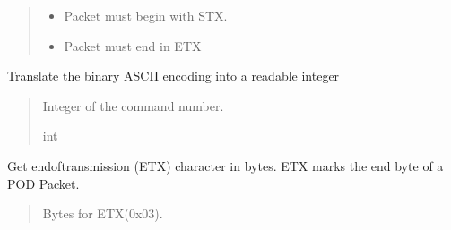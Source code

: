 \documentclass[letterpaper,10pt,english]{sphinxmanual}
\begin{document}
\begin{fulllineitems}
\begin{fulllineitems}
\begin{quote}
\begin{description}
\begin{itemize}
\item {} 
\sphinxAtStartPar
{} \textendash{} Packet must begin with STX.

\item {} 
\sphinxAtStartPar
{} \textendash{} Packet must end in ETX

\end{itemize}

\end{description}\end{quote}

\end{fulllineitems}


\begin{fulllineitems}
\label{\detokenize{PodApi.Packets:PodApi.Packets.Packet.Packet.CommandNumber}}
\pysigstartsignatures
{}
\pysigstopsignatures
\sphinxAtStartPar
Translate the binary ASCII encoding into a readable integer
\begin{quote}\begin{description}
\sphinxAtStartPar
Integer of the command number.

\sphinxAtStartPar
int

\end{description}\end{quote}

\end{fulllineitems}


\begin{fulllineitems}
\label{\detokenize{PodApi.Packets:PodApi.Packets.Packet.Packet.ETX}}
\pysigstartsignatures
{}
\pysigstopsignatures
\sphinxAtStartPar
Get end\sphinxhyphen{}of\sphinxhyphen{}transmission (ETX) character in bytes. ETX marks the end byte of a POD Packet.
\begin{quote}\begin{description}
\sphinxAtStartPar
Bytes for ETX(0x03).


\end{description}
\end{quote}
\end{fulllineitems}
\end{fulllineitems}
\end{document}

